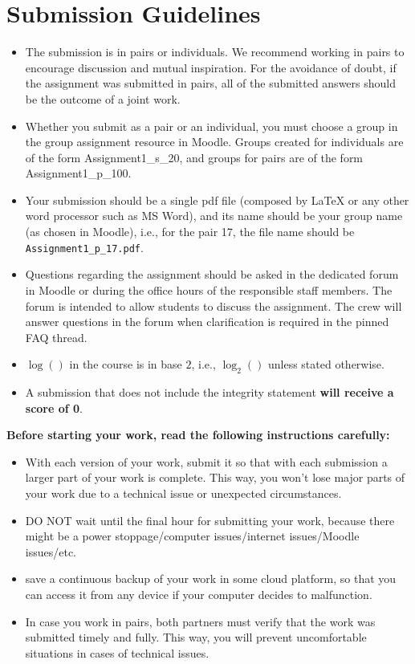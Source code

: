 \documentclass[a4paper]{article}
\theoremstyle{remarksStyle}
\theoremstyle{questionStyle}
\theoremstyle{answerStyle}
\begin{document}
\section{Submission Guidelines}
\begin{itemize}
    \item The submission is in pairs or individuals. We recommend working in pairs to encourage discussion and mutual inspiration.
    For the avoidance of doubt, if the assignment was submitted in pairs, all of the submitted answers should be the outcome of a joint work.
    \item Whether you submit as a pair or an individual, you must choose a group in the group assignment resource in Moodle.
    Groups created for individuals are of the form Assignment1\_s\_20, and groups for pairs are of the form Assignment1\_p\_100.
    \item Your submission should be a single pdf file (composed by LaTeX or any other word processor such as MS Word), and its name should be your group name (as chosen in Moodle), i.e., for the pair 17, the file name should be \verb!Assignment1_p_17.pdf!.
    \item Questions regarding the assignment should be asked in the dedicated forum in Moodle or during the office hours of the responsible staff members.
    The forum is intended to allow students to discuss the assignment. 
    The crew will answer questions in the forum when clarification is required in the pinned FAQ thread. 
    \item $\log{()}$ in the course is in base $2$, i.e., $\log_2{()}$ unless stated otherwise.
    \item A submission that does not include the integrity statement \textbf{\textcolor{Bittersweet}{will receive a score of 0}}.
\end{itemize}

\textbf{Before starting your work, read the following instructions carefully:}
\begin{itemize}
\item With each version of your work, submit it so that with each submission a larger part of your work is complete. This way, you won't lose major parts of your work due to a technical issue or unexpected circumstances.
\item DO NOT wait until the final hour for submitting your work, because there might be a power stoppage/computer issues/internet issues/Moodle issues/etc.
\item save a continuous backup of your work in some cloud platform, so that you can access it from any device if your computer decides to malfunction.
\item In case you work in pairs, both partners must verify that the work was submitted timely and fully. This way, you will prevent uncomfortable situations in cases of technical issues.
\end{itemize}
\end{document}

